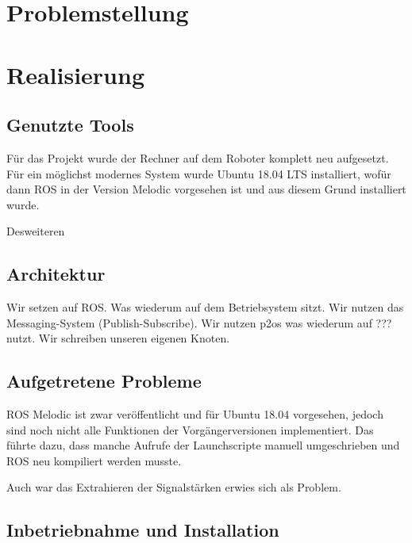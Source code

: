 \documentclass{scrartcl}%
\begin{document}
\section{Problemstellung}

\section{Realisierung}
\subsection{Genutzte Tools}
Für das Projekt wurde der Rechner auf dem Roboter komplett neu aufgesetzt. Für ein möglichst modernes System wurde Ubuntu 18.04 LTS installiert, wofür dann ROS in der Version Melodic vorgesehen ist und aus diesem Grund installiert wurde.

Desweiteren 


\subsection{Architektur}
Wir setzen auf ROS. Was wiederum auf dem Betriebsystem sitzt. Wir nutzen das Messaging-System (Publish-Subscribe). Wir nutzen p2os was wiederum auf ??? nutzt. Wir schreiben unseren eigenen Knoten.

\subsection{Aufgetretene Probleme}
ROS Melodic ist zwar veröffentlicht und für Ubuntu 18.04 vorgesehen, jedoch sind noch nicht alle Funktionen der Vorgängerversionen implementiert. Das führte dazu, dass manche Aufrufe der Launchscripte manuell umgeschrieben und ROS neu kompiliert werden musste.

Auch war das Extrahieren der Signalstärken erwies sich als Problem.

\subsection{Inbetriebnahme und Installation}
\end{document}
